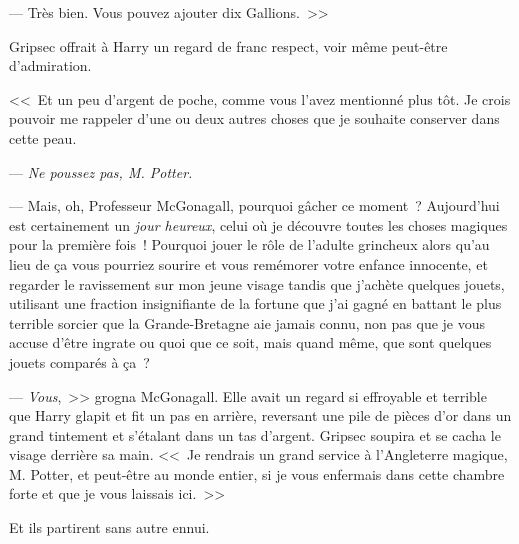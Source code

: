 --- Très bien. Vous pouvez ajouter dix Gallions.~>>

Gripsec offrait à Harry un regard de franc respect, voir même peut-être d'admiration.

<<~Et un peu d'argent de poche, comme vous l'avez mentionné plus tôt. Je crois pouvoir me rappeler d'une ou deux autres choses que je souhaite conserver dans cette peau.

--- \emph{Ne poussez pas, M. Potter.}

--- Mais, oh, Professeur McGonagall, pourquoi gâcher ce moment~? Aujourd'hui est certainement un \emph{jour heureux}, celui où je découvre toutes les choses magiques pour la première fois~! Pourquoi jouer le rôle de l'adulte grincheux alors qu'au lieu de ça vous pourriez sourire et vous remémorer votre enfance innocente, et regarder le ravissement sur mon jeune visage tandis que j'achète quelques jouets, utilisant une fraction insignifiante de la fortune que j'ai gagné en battant le plus terrible sorcier que la Grande-Bretagne aie jamais connu, non pas que je vous accuse d'être ingrate ou quoi que ce soit, mais quand même, que sont quelques jouets comparés à ça~?

--- \emph{Vous},~>> grogna McGonagall. Elle avait un regard si effroyable et terrible que Harry glapit et fit un pas en arrière, reversant une pile de pièces d'or dans un grand tintement et s'étalant dans un tas d'argent. Gripsec soupira et se cacha le visage derrière sa main. <<~Je rendrais un grand service à l'Angleterre magique, M. Potter, et peut-être au monde entier, si je vous enfermais dans cette chambre forte et que je vous laissais ici.~>>

Et ils partirent sans autre ennui.

